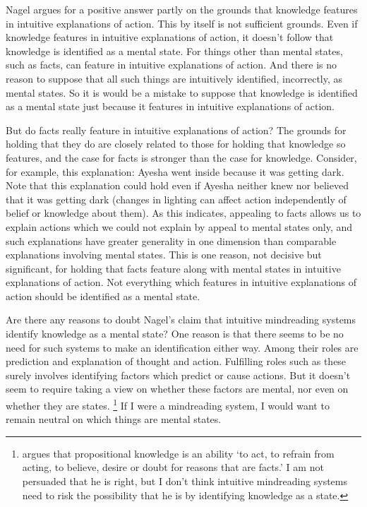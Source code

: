 \documentclass[11pt,a4paper]{extarticle}
\begin{document}
Nagel argues for a positive answer
partly on the grounds that 
knowledge features in intuitive explanations of action.
This by itself is not sufficient grounds.
Even if knowledge features in intuitive explanations of action, 
it doesn't follow that
knowledge is identified as a mental state.
For things other than mental states, such as facts, can feature in intuitive explanations of action.
And there is no reason to suppose that all such things are intuitively identified, incorrectly, as mental states.
So it is would be a mistake to suppose that knowledge is identified as a mental state just because it features in intuitive explanations of action.

But do facts really feature in intuitive explanations of action?
The grounds for holding that they do are closely related to those for holding that knowledge so features, and the case for facts is stronger than the case for knowledge.
Consider, for example, this explanation: Ayesha went inside because it was getting dark.
Note that this explanation could hold even if Ayesha neither knew nor believed that it was getting dark (changes in lighting can affect action independently of belief or knowledge about them).
As this indicates, appealing to facts allows us to explain actions which we could not explain by appeal to mental states only, and such explanations have greater generality in one dimension than comparable explanations involving mental states.
This is one reason, not decisive but significant, for holding that facts feature along with mental states in intuitive explanations of action.
Not everything which features in intuitive explanations of action should be identified as a mental state.



Are there any reasons to doubt  Nagel's claim that intuitive mindreading systems identify knowledge as a mental state?
One reason is that there seems to be no need for such systems to make an identification either way.
Among their roles are prediction and explanation of thought and action.
Fulfilling roles such as these surely involves identifying factors which predict or cause actions. 
But it doesn't seem to require taking a view on whether these factors are mental, nor even on whether they are states.%
\footnote{
\citet[p.\ 451]{Hyman:1999fk} argues that propositional knowledge is an ability `to act, to refrain from acting, to believe, desire or doubt for reasons that are facts.' 
I am not persuaded that he is right, but I don't think intuitive mindreading systems need to risk the possibility that he is by identifying knowledge as a state.
}
If I were a mindreading system, I would want to remain neutral on which things are mental states.
\end{document}
